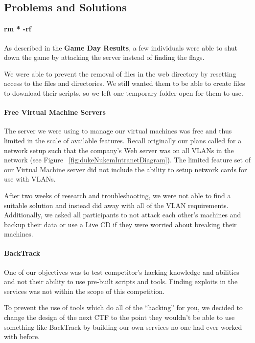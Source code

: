 \documentclass[10pt]{article}
\begin{document}
\subsection{Problems and Solutions}
\paragraph*{rm * -rf} As described in the \textbf{Game Day Results},
a few individuals were able to shut down the game by attacking the server
instead of finding the flags.

We were able to prevent the removal of files in the web directory by resetting
access to the files and directories. We still wanted them to be able to create
files to download their scripts, so we left one temporary folder open for them to
use. 

\paragraph*{Free Virtual Machine Servers} The server we were using to manage our
virtual machines was free and thus limited in the scale of available features.
Recall originally our plans called for a network setup such that the company's
Web server was on all VLANs in the network (see Figure
~\ref{fig:dukeNukemIntranetDiagram}). The limited feature set of our Virtual
Machine server did not include the ability to setup network cards for use with
VLANs. 

After two weeks of research and troubleshooting, we were not able to find a
suitable solution and instead did away with all of the VLAN requirements.
Additionally, we asked all participants to not attack each other's machines and
backup their data or use a Live CD if they were worried about breaking their
machines.

\paragraph*{BackTrack} One of our objectives was to test competitor's hacking
knowledge and abilities and not their ability to use pre-built scripts and
tools. Finding exploits in the services was not within the scope of this
competition. 

To prevent the use of tools which do all of the ``hacking'' for you, we decided
to change the design of the next CTF to the point they wouldn't be able to use
something like BackTrack by building our own services no one had ever worked
with before. 
\end{document}
